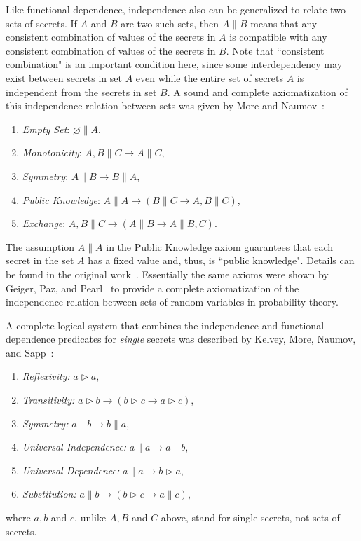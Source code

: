 \documentclass{llncs}
\begin{document}
Like functional dependence, independence also can be generalized to relate two sets of secrets. If $A$ and $B$ are two such sets, then $A\parallel B$ means that any consistent combination of values of the secrets in $A$ is compatible with any consistent combination of values of the secrets in $B$. Note that ``consistent combination" is an important condition here, since some interdependency may exist between secrets in set $A$ even while the entire set of secrets $A$ is independent from the secrets in set $B$. A sound and complete axiomatization of this independence relation between sets was given by More and Naumov~\cite{mn10}:
\begin{enumerate}
\item {\em Empty Set}: $\varnothing\parallel A$,
\item {\em Monotonicity}: $A,B\parallel C\rightarrow A\parallel C$,
\item {\em Symmetry}: $A\parallel B \rightarrow B\parallel A$,
\item {\em Public Knowledge}: $A\parallel A \rightarrow (B\parallel C \rightarrow A,B\parallel C)$,
\item {\em Exchange}: $A,B\parallel C\rightarrow (A\parallel B\rightarrow A \parallel B,C)$.
\end{enumerate}
The assumption $A\parallel A$ in the Public Knowledge axiom guarantees that each secret in the set $A$ has a fixed value and, thus, is ``public knowledge". Details can be found in the original work~\cite{mn10}. Essentially the same axioms were shown by Geiger, Paz, and Pearl~\cite{gpp91} to provide a complete axiomatization of the independence relation between sets of random variables in probability theory. 

A complete logical system that combines the independence and functional dependence predicates for {\em single} secrets was described by Kelvey, More, Naumov, and Sapp~\cite{kmns10}:
\begin{enumerate}
\item {\em Reflexivity:} $a\rhd a$,
\item {\em Transitivity:} $a\rhd b \rightarrow (b\rhd c \rightarrow a \rhd c)$,
\item {\em Symmetry:} $a \parallel b \rightarrow b \parallel a$,
\item {\em Universal Independence:} $a\parallel a \rightarrow a \parallel b$, 
\item {\em Universal Dependence:} $a\parallel a \rightarrow b \rhd a$,
\item {\em Substitution:} $a\parallel b \rightarrow (b\rhd c \rightarrow a\parallel c)$,
\end{enumerate}
where $a,b$ and $c$, unlike $A,B$ and $C$ above, stand for single secrets, not sets of secrets.
\end{document}
